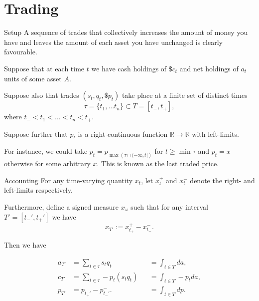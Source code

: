 \documentclass{beamer}
\newcommand{\sectionquote}[1]{\def\insertsquote{#1}}
\newcommand{\insertsquote}{}
\renewcommand{\insertsquote}{}
\begin{document}
\sectionquote{``To gain an advantage from better knowledge of facilities of communication or transport is sometimes regarded as almost dishonest, although it is quite as important that society make use of the best opportunities in this respect as in using the latest scientific discoveries.'' Hayek}
\section{Trading}
\begin{frame}{Setup}
	A sequence of trades that collectively increases the amount of money you have and leaves the amount of each asset you have unchanged is clearly favourable.

	\pause

	Suppose that at each time $t$ we have cash holdings of $\$c_t$ and net holdings of $a_t$ units of some asset $A$.

	Suppose also that trades $(s_t, q_t, \$p_t)$ take place at a finite set of distinct times
	$$\tau = \{t_1,\ldots t_n\}\subset T = [t_-, t_+],$$
	where $t_-<t_1<\ldots<t_n<t_+$.

	\pause

	Suppose further that $p_t$ is a right-continuous function $\mathbb R\to\mathbb R$ with left-limits.

	For instance, we could take $p_t = p_{\max \left(\tau\cap (-\infty,t]\right)}$ for $t\geq \min\tau$ and $p_t=x$ otherwise for some arbitrary $x$. This is known as the last traded price.
\end{frame}

\begin{frame}{Accounting}
	For any time-varying quantity $x_t$, let $x_t^+$ and $x_t^-$ denote the right- and left-limits respectively.

	Furthermore, define a signed measure $x_\omega$ such that for any interval $T'=[t_-',t_+']$ we have
	$$x_{T'} := x_{t_+}^+ - x_{t_-}^-.$$

	\pause

	Then we have

	\vspace{-0.06\textheight}
	\begin{align*}
		a_{T'}	&= \sum_{t\in \tau} s_t q_t		&&= \int_{t\in T} da,
	\\	c_{T'}	&= \sum_{t\in \tau} - p_t (s_t q_t)	&&= \int_{t\in T} - p_t da,
	\\	p_{T'}	&= p_{t_+'} - p_{t_-'}^-.		&&= \int_{t\in T} dp.
	\end{align*}%
\end{frame}
\end{document}
